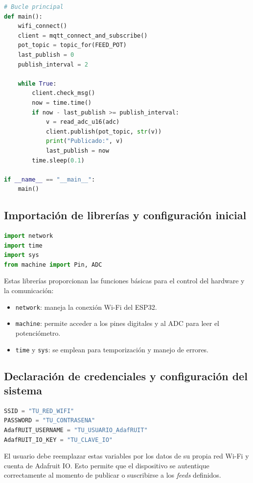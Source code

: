 \documentclass[a4paper,12pt]{article}
\begin{document}
\begin{lstlisting}[language=Python, caption={Código completo para conexión ESP32 -- Adafruit IO en MicroPython.}]
# Bucle principal
def main():
    wifi_connect()
    client = mqtt_connect_and_subscribe()
    pot_topic = topic_for(FEED_POT)
    last_publish = 0
    publish_interval = 2

    while True:
        client.check_msg()
        now = time.time()
        if now - last_publish >= publish_interval:
            v = read_adc_u16(adc)
            client.publish(pot_topic, str(v))
            print("Publicado:", v)
            last_publish = now
        time.sleep(0.1)

if __name__ == "__main__":
    main()
\end{lstlisting}

\newpage

\subsection{Importación de librerías y configuración inicial}

\begin{lstlisting}[language=Python]
import network
import time
import sys
from machine import Pin, ADC
\end{lstlisting}

Estas librerías proporcionan las funciones básicas para el control del hardware y la comunicación:
\begin{itemize}
    \item \texttt{network}: maneja la conexión Wi-Fi del ESP32.
    \item \texttt{machine}: permite acceder a los pines digitales y al ADC para leer el potenciómetro.
    \item \texttt{time} y \texttt{sys}: se emplean para temporización y manejo de errores.
\end{itemize}

\subsection{Declaración de credenciales y configuración del sistema}

\begin{lstlisting}[language=Python]
SSID = "TU_RED_WIFI"
PASSWORD = "TU_CONTRASENA"
AdafRUIT_USERNAME = "TU_USUARIO_AdafRUIT"
AdafRUIT_IO_KEY = "TU_CLAVE_IO"
\end{lstlisting}

El usuario debe reemplazar estas variables por los datos de su propia red Wi-Fi y cuenta de Adafruit IO.  
Esto permite que el dispositivo se autentique correctamente al momento de publicar o suscribirse a los \textit{feeds} definidos.
\end{document}
